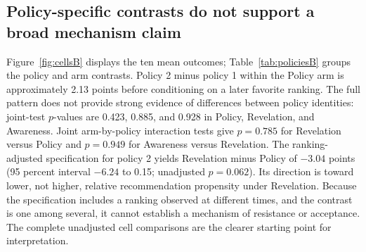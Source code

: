 \subsection{Policy-specific contrasts do not support a broad mechanism claim}
Figure~\ref{fig:cellsB} displays the ten mean outcomes; Table~\ref{tab:policiesB} groups the policy and arm contrasts. Policy 2 minus policy 1 within the Policy arm is approximately 2.13 points before conditioning on a later favorite ranking. The full pattern does not provide strong evidence of differences between policy identities: joint-test $p$-values are 0.423, 0.885, and 0.928 in Policy, Revelation, and Awareness. Joint arm-by-policy interaction tests give $p=0.785$ for Revelation versus Policy and $p=0.949$ for Awareness versus Revelation.
The ranking-adjusted specification for policy 2 yields Revelation minus Policy of $-3.04$ points (95 percent interval $-6.24$ to 0.15; unadjusted $p=0.062$). Its direction is toward lower, not higher, relative recommendation propensity under Revelation. Because the specification includes a ranking observed at different times, and the contrast is one among several, it cannot establish a mechanism of resistance or acceptance. The complete unadjusted cell comparisons are the clearer starting point for interpretation.


